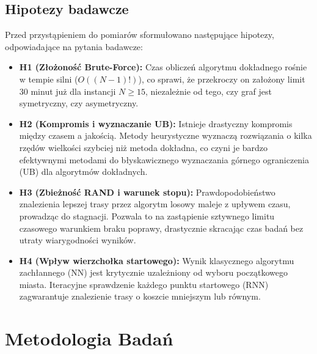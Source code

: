 \documentclass[conference]{IEEEtran}
\begin{document}
        \subsection{Hipotezy badawcze}
            Przed przystąpieniem do pomiarów sformułowano następujące hipotezy, odpowiadające na pytania badawcze:
            \begin{itemize}
                \item \textbf{H1 (Złożoność Brute-Force):} Czas obliczeń algorytmu dokładnego rośnie w tempie silni ($O((N-1)!)$), co sprawi, że przekroczy on założony limit 30 minut już dla instancji $N \ge 15$, niezależnie od tego, czy graf jest symetryczny, czy asymetryczny.
                \item \textbf{H2 (Kompromis i wyznaczanie UB):} Istnieje drastyczny kompromis między czasem a jakością. Metody heurystyczne wyznaczą rozwiązania o kilka rzędów wielkości szybciej niż metoda dokładna, co czyni je bardzo efektywnymi metodami do błyskawicznego wyznaczania górnego ograniczenia (UB) dla algorytmów dokładnych.
                \item \textbf{H3 (Zbieżność RAND i warunek stopu):} Prawdopodobieństwo znalezienia lepszej trasy przez algorytm losowy maleje z upływem czasu, prowadząc do stagnacji. Pozwala to na zastąpienie sztywnego limitu czasowego warunkiem braku poprawy, drastycznie skracając czas badań bez utraty wiarygodności wyników.
                \item \textbf{H4 (Wpływ wierzchołka startowego):} Wynik klasycznego algorytmu zachłannego (NN) jest krytycznie uzależniony od wyboru początkowego miasta. Iteracyjne sprawdzenie każdego punktu startowego (RNN) zagwarantuje znalezienie trasy o koszcie mniejszym lub równym.
            \end{itemize}


    \section{Metodologia Badań}
\end{document}

